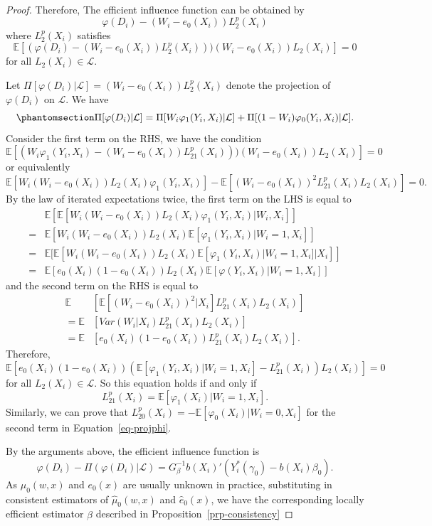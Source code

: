 \documentclass[
  12pt,
  12pt]{article}
\numberwithin{equation}{section}
\theoremstyle{definition}
\theoremstyle{plain}
\theoremstyle{plain}
\theoremstyle{remark}
\begin{document}
\begin{proof}
Therefore, The efficient influence function can be obtained by \[
\varphi(D_i) - (W_i - e_0(X_i))L^p_2(X_i)
\] where \(L^p_2(X_i)\) satisfies \[
\mathbb{E}[(\varphi(D_i) - (W_i - e_0(X_i))L^p_2(X_i)))(W_i - e_0(X_i))L_2(X_i)] = 0
\] for all \(L_2(X_i) \in \mathcal{L}\).

Let \(\Pi[\varphi(D_i)|\mathcal{L}] = (W_i - e_0(X_i))L^p_2(X_i)\)
denote the projection of \(\varphi(D_i)\) on \(\mathcal{L}\). We have
\begin{equation}\phantomsection\label{eq-projphi}{
\Pi[\varphi(D_i)|\mathcal{L}] = \Pi[W_i\varphi_1(Y_i, X_i)|\mathcal{L}] + \Pi[(1 - W_i)\varphi_0(Y_i, X_i)|\mathcal{L}].
}\end{equation} Consider the first term on the RHS, we have the
condition \[
\mathbb{E}[(W_i\varphi_1(Y_i, X_i) - (W_i - e_0(X_i))L^p_{21}(X_i)))(W_i - e_0(X_i))L_2(X_i)] = 0 
\] or equivalently \[
\mathbb{E}[W_i(W_i - e_0(X_i))L_2(X_i)\varphi_1(Y_i, X_i)] - \mathbb{E}[(W_i - e_0(X_i))^2L^p_{21}(X_i)L_2(X_i)] = 0.
\] By the law of iterated expectations twice, the first term on the LHS
is equal to \[
\begin{aligned}
&\mathbb{E}[\mathbb{E}[W_i(W_i - e_0(X_i))L_2(X_i)\varphi_1(Y_i, X_i)|W_i, X_i]] \\
= &\mathbb{E}[W_i(W_i - e_0(X_i))L_2(X_i)\mathbb{E}[\varphi_1(Y_i, X_i)|W_i = 1, X_i]] \\
= &\mathbb{E}[\mathbb{E}[W_i(W_i - e_0(X_i))L_2(X_i)\mathbb{E}[\varphi_1(Y_i, X_i)|W_i = 1, X_i]|X_i]] \\
= &\mathbb{E}[e_0(X_i)(1 - e_0(X_i))L_2(X_i)\mathbb{E}[\varphi(Y_i, X_i)|W_i = 1, X_i]]
\end{aligned}
\] and the second term on the RHS is equal to \[
\begin{aligned}
\mathbb{E}&[\mathbb{E}[(W_i - e_0(X_i))^2|X_i]L^p_{21}(X_i)L_2(X_i)] \\
= \mathbb{E}&[Var(W_i|X_i)L^p_{21}(X_i)L_2(X_i)] \\
= \mathbb{E}&[e_0(X_i)(1 - e_0(X_i))L^p_{21}(X_i)L_2(X_i)].
\end{aligned}
\] Therefore, \[
\mathbb{E}[e_0(X_i)(1 - e_0(X_i))(\mathbb{E}[\varphi_1(Y_i, X_i)|W_i = 1, X_i] - L^p_{21}(X_i))L_2(X_i)] = 0
\] for all \(L_2(X_i) \in \mathcal{L}\). So this equation holds if and
only if \[
L^p_{21}(X_i) = \mathbb{E}[\varphi_1(X_i)|W_i = 1, X_i].
\] Similarly, we can prove that
\(L^p_{20}(X_i) = -\mathbb{E}[\varphi_0(X_i)|W_i = 0, X_i]\) for the
second term in Equation~\ref{eq-projphi}.

By the arguments above, the efficient influence function is \[
\varphi(D_i) - \Pi(\varphi(D_i)|\mathcal{L}) = G_\beta^{-1}b(X_i)'\left(Y_i^*(\gamma_0) - b(X_i)\beta_0\right).
\] As \(\mu_0(w, x)\) and \(e_0(x)\) are usually unknown in practice,
substituting in consistent estimators of \(\hat\mu_0(w, x)\) and
\(\hat{e}_0(x)\), we have the corresponding locally efficient estimator
\(\hat\beta\) described in Proposition~\ref{prp-consistency}
\end{proof}
\end{document}
